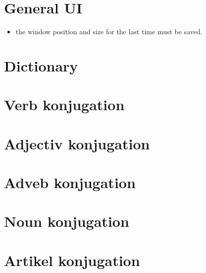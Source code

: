 \documentclass[a4paper]{article}
\title{}
\date{}
\author{Mohammad Rahmani}
\begin{document}
   \maketitle
   
   \section{General UI}
   \begin{itemize}
       \item the window position and size for the last time must be saved. 
   \end{itemize}
   \section{Dictionary}
   \section{Verb konjugation}
   \section{Adjectiv konjugation}
   \section{Adveb konjugation}
   \section{Noun konjugation}
   \section{Artikel konjugation}

   
   
\end{document}

